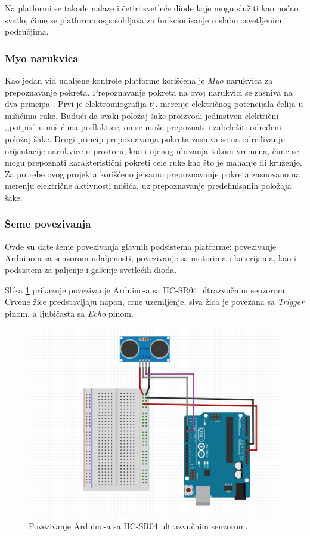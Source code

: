 \documentclass[12pt,a4paper]{report}
\begin{document}
Na platformi se takođe nalaze i četiri svetleće diode koje mogu služiti kao noćno svetlo, čime se platforma osposobljava za funkcionisanje u slabo osvetljenim područjima.

\subsubsection{Myo narukvica}
Kao jedan vid udaljene kontrole platforme korišćena je \textit{Myo} narukvica za prepoznavanje pokreta. Prepoznavanje pokreta na ovoj narukvici se zasniva na dva principa \cite{myo}. Prvi je elektromiografija tj. merenje električnog potencijala ćelija u mišićima ruke. Budući da svaki položaj šake proizvodi jedinstven električni ,,potpis'' u mišićima podlaktice, on se može prepoznati i zabeležiti određeni položaj šake. Drugi princip prepoznavanja pokreta zasniva se na određivanju orijentacije narukvice u prostoru, kao i njenog ubrzanja tokom vremena, čime se mogu prepoznati karakteristični pokreti cele ruke kao što je mahanje ili kruženje. Za potrebe ovog projekta korišćeno je samo prepoznavanje pokreta zasnovano na merenju električne aktivnosti mišića, uz prepoznavanje predefinisanih položaja šake. 

\subsubsection{Šeme povezivanja}
Ovde su date šeme povezivanja glavnih podsistema platforme: povezivanje Arduino-a sa senzorom udaljenosti, povezivanje sa motorima i baterijama, kao i podsistem za paljenje i gašenje svetlećih dioda.

Slika \ref{fig:distance_sensor} prikazuje povezivanje Arduino-a sa HC-SR04 ultrazvučnim senzorom. Crvene žice predstavljaju napon, crne uzemljenje, siva žica je povezana sa \textit{Trigger} pinom, a ljubičasta sa \textit{Echo} pinom.

\begin{figure}[H]
    \centering
    \includegraphics[scale=0.41]{img/distance_sensor.jpg}
    \caption{Povezivanje Arduino-a sa HC-SR04 ultrazvučnim senzorom.}
    \label{fig:distance_sensor}
\end{figure}
\end{document}
